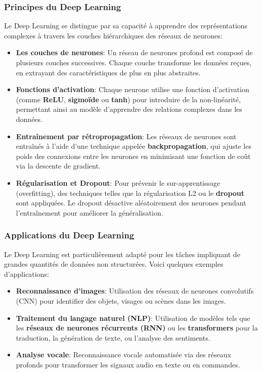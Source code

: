 \subsubsection{Principes du Deep Learning}

Le Deep Learning se distingue par sa capacité à apprendre des représentations complexes à travers les couches hiérarchiques des réseaux de neurones:

\begin{itemize}
    \item \textbf{Les couches de neurones}: Un réseau de neurones profond est composé de plusieurs couches successives. Chaque couche transforme les données reçues, en extrayant des caractéristiques de plus en plus abstraites.
    \item \textbf{Fonctions d'activation}: Chaque neurone utilise une fonction d'activation (comme \textbf{ReLU}, \textbf{sigmoïde} ou \textbf{tanh}) pour introduire de la non-linéarité, permettant ainsi au modèle d'apprendre des relations complexes dans les données.
    \item \textbf{Entraînement par rétropropagation}: Les réseaux de neurones sont entraînés à l'aide d'une technique appelée \textbf{backpropagation}, qui ajuste les poids des connexions entre les neurones en minimisant une fonction de coût via la descente de gradient.
    \item \textbf{Régularisation et Dropout}: Pour prévenir le sur-apprentissage (overfitting), des techniques telles que la régularisation L2 ou le \textbf{dropout} sont appliquées. Le dropout désactive aléatoirement des neurones pendant l'entraînement pour améliorer la généralisation.
\end{itemize}

\subsubsection{Applications du Deep Learning}

Le Deep Learning est particulièrement adapté pour les tâches impliquant de grandes quantités de données non structurées. Voici quelques exemples d'applications:

\begin{itemize}
    \item \textbf{Reconnaissance d'images}: Utilisation des réseaux de neurones convolutifs (CNN) pour identifier des objets, visages ou scènes dans les images.
    \item \textbf{Traitement du langage naturel (NLP)}: Utilisation de modèles tels que les \textbf{réseaux de neurones récurrents (RNN)} ou les \textbf{transformers} pour la traduction, la génération de texte, ou l'analyse des sentiments.
    \item \textbf{Analyse vocale}: Reconnaissance vocale automatisée via des réseaux profonds pour transformer les signaux audio en texte ou en commandes.
\end{itemize}

